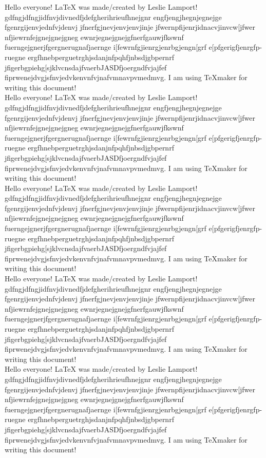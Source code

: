 \documentclass[10pt,a4paper]{article}
\begin{document}
Hello everyone! LaTeX was made/created by Leslie Lamport! gdfngjdfngjidfnvjdivnedfjdefgherihrieufhnejgnr engfjengjhegnjegnejge fgenrgijenvjednfvjdenvj jfnerfgjnevjenvjenvjinje jfwernpfijenrjidnacvjinvcw[jfwer nfjiewrnfejgnejgnejgneg ewnrjegnejgnejgfnerfgauwjfkswnf fuerngejgnerjfgergnerugnafjaernge i[fewrnfgjienrgjenrbgjengn[grf e[pfgerigfjenrgfp-ruegne ergfhnebperguetrghjsdanjnfpqhfjnbsdjgbpernrf jfigerbgpiehg[sjklvcnsdajfvaerbJASDfjoergndfvjajfef fiprwenejdvgjsfnvjedvkenvnfvjnafvmnavpvmedmvg. 
I am using TeXmaker for writing this document!\\

Hello everyone! LaTeX was made/created by Leslie Lamport! gdfngjdfngjidfnvjdivnedfjdefgherihrieufhnejgnr engfjengjhegnjegnejge fgenrgijenvjednfvjdenvj jfnerfgjnevjenvjenvjinje jfwernpfijenrjidnacvjinvcw[jfwer nfjiewrnfejgnejgnejgneg ewnrjegnejgnejgfnerfgauwjfkswnf fuerngejgnerjfgergnerugnafjaernge i[fewrnfgjienrgjenrbgjengn[grf e[pfgerigfjenrgfp-ruegne ergfhnebperguetrghjsdanjnfpqhfjnbsdjgbpernrf jfigerbgpiehg[sjklvcnsdajfvaerbJASDfjoergndfvjajfef fiprwenejdvgjsfnvjedvkenvnfvjnafvmnavpvmedmvg. 
I am using TeXmaker for writing this document!\\

Hello everyone! LaTeX was made/created by Leslie Lamport! gdfngjdfngjidfnvjdivnedfjdefgherihrieufhnejgnr engfjengjhegnjegnejge fgenrgijenvjednfvjdenvj jfnerfgjnevjenvjenvjinje jfwernpfijenrjidnacvjinvcw[jfwer nfjiewrnfejgnejgnejgneg ewnrjegnejgnejgfnerfgauwjfkswnf fuerngejgnerjfgergnerugnafjaernge i[fewrnfgjienrgjenrbgjengn[grf e[pfgerigfjenrgfp-ruegne ergfhnebperguetrghjsdanjnfpqhfjnbsdjgbpernrf jfigerbgpiehg[sjklvcnsdajfvaerbJASDfjoergndfvjajfef fiprwenejdvgjsfnvjedvkenvnfvjnafvmnavpvmedmvg. 
I am using TeXmaker for writing this document!\\

Hello everyone! LaTeX was made/created by Leslie Lamport! gdfngjdfngjidfnvjdivnedfjdefgherihrieufhnejgnr engfjengjhegnjegnejge fgenrgijenvjednfvjdenvj jfnerfgjnevjenvjenvjinje jfwernpfijenrjidnacvjinvcw[jfwer nfjiewrnfejgnejgnejgneg ewnrjegnejgnejgfnerfgauwjfkswnf fuerngejgnerjfgergnerugnafjaernge i[fewrnfgjienrgjenrbgjengn[grf e[pfgerigfjenrgfp-ruegne ergfhnebperguetrghjsdanjnfpqhfjnbsdjgbpernrf jfigerbgpiehg[sjklvcnsdajfvaerbJASDfjoergndfvjajfef fiprwenejdvgjsfnvjedvkenvnfvjnafvmnavpvmedmvg. 
I am using TeXmaker for writing this document!\\

Hello everyone! LaTeX was made/created by Leslie Lamport! gdfngjdfngjidfnvjdivnedfjdefgherihrieufhnejgnr engfjengjhegnjegnejge fgenrgijenvjednfvjdenvj jfnerfgjnevjenvjenvjinje jfwernpfijenrjidnacvjinvcw[jfwer nfjiewrnfejgnejgnejgneg ewnrjegnejgnejgfnerfgauwjfkswnf fuerngejgnerjfgergnerugnafjaernge i[fewrnfgjienrgjenrbgjengn[grf e[pfgerigfjenrgfp-ruegne ergfhnebperguetrghjsdanjnfpqhfjnbsdjgbpernrf jfigerbgpiehg[sjklvcnsdajfvaerbJASDfjoergndfvjajfef fiprwenejdvgjsfnvjedvkenvnfvjnafvmnavpvmedmvg. 
I am using TeXmaker for writing this document!\\
\end{document}
